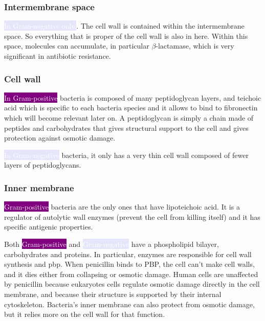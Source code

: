 \subsubsection{Intermembrane space}

\colorbox{Lavender}{\textcolor{white}{In Gram-negative only.}}. The cell wall is contained within the intermembrane space. So everything that is proper of the cell wall is also in here. Within this space, molecules can accumulate, in particular $\beta$-lactamase, which is very significant in antibiotic resistance.

\subsubsection{Cell wall}

\colorbox{Purple}{\textcolor{white}{In Gram-positive}} bacteria is composed of many peptidoglycan layers, and teichoic acid which is specific to each bacteria species and it allows to bind to fibronectin which will become relevant later on. A peptidoglycan is simply a chain made of peptides and carbohydrates that gives structural support to the cell and gives protection against osmotic damage.

\colorbox{Lavender}{\textcolor{white}{In Gram-negative}} bacteria, it only has a very thin cell wall composed of fewer layers of peptidoglycans.


\subsubsection{Inner membrane}

\colorbox{Purple}{\textcolor{white}{Gram-positive}} bacteria are the only ones that have lipoteichoic acid. It is a regulator of autolytic wall enzymes (prevent the cell from killing itself) and it has specific antigenic properties.

Both \colorbox{Purple}{\textcolor{white}{Gram-positive}} and \colorbox{Lavender}{\textcolor{white}{Gram-negative}} have a phospholipid bilayer, carbohydrates and proteins. In particular, enzymes are responsible for cell wall synthesis and \gls{pbp}. When penicillin binds to PBP, the cell can't make cell walls, and it dies either from collapsing or osmotic damage. Human cells are unaffected by penicillin because eukaryotes cells regulate osmotic damage directly in the cell membrane, and because their structure is supported by their internal cytoskeleton. Bacteria's inner membrane can also protect from osmotic damage, but it relies more on the cell wall for that function.

